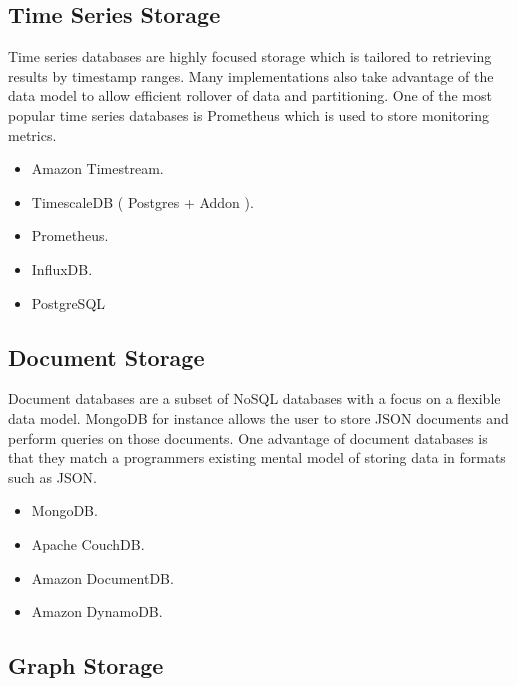 \documentclass{csse4400}
\begin{document}
\subsection{Time Series Storage}


Time series databases are highly focused storage which is tailored to retrieving results by timestamp ranges.
Many implementations also take advantage of the data model to allow efficient rollover of data and partitioning.
One of the most popular time series databases is Prometheus which is used to store monitoring metrics.

\begin{itemize}
  \item Amazon Timestream.
  \item TimescaleDB ( Postgres + Addon ).
  \item Prometheus.
  \item InfluxDB.
  \item PostgreSQL
\end{itemize}

\subsection{Document Storage}

Document databases are a subset of NoSQL databases with a focus on a flexible data model.
MongoDB for instance allows the user to store JSON documents and perform queries on those documents.
One advantage of document databases is that they match a programmers existing mental model of storing data in formats such as JSON.

\begin{itemize}
  \item MongoDB.
  \item Apache CouchDB.
  \item Amazon DocumentDB.
  \item Amazon DynamoDB.
\end{itemize}

\subsection{Graph Storage}

\end{document}

